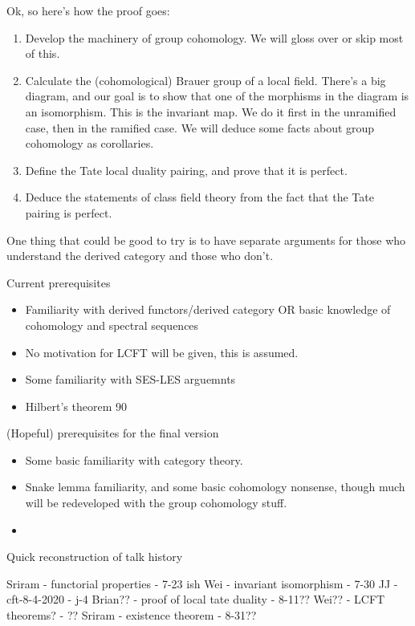 \documentclass[a4paper]{article}
\title{}
\author{Jack J Garzella}
\begin{document}
\maketitle


Ok, so here's how the proof goes:

\begin{enumerate}[(1)]
	\item Develop the machinery of group cohomology.
		We will gloss over or skip most of this.
	\item Calculate the (cohomological) Brauer group of 
		a local field. 
		There's a big diagram, and our goal is to show that
		one of the morphisms in the diagram is an isomorphism.
		This is the invariant map. 
		We do it first in the unramified case, then
		in the ramified case.
		We will deduce some facts about group cohomology as
		corollaries.
	\item Define the Tate local duality pairing, and prove that it
		is perfect.
	\item Deduce the statements of class field theory from the
		fact that the Tate pairing is perfect.
\end{enumerate}

One thing that could be good to try is to have separate 
arguments for those who understand the derived category and those
who don't.

Current prerequisites
\begin{itemize}
	\item Familiarity with derived functors/derived category
		OR basic knowledge of cohomology and spectral sequences
	\item No motivation for LCFT will be given, this is assumed.
	\item Some familiarity with SES-LES arguemnts
	\item Hilbert's theorem 90
\end{itemize}

(Hopeful) prerequisites for the final version
\begin{itemize}
	\item Some basic familiarity with category theory.
	\item Snake lemma familiarity, and some basic
		cohomology nonsense, though much will be redeveloped
		with the group cohomology stuff.
	\item 
\end{itemize}

Quick reconstruction of talk history

Sriram - functorial properties - 7-23 ish
Wei - invariant isomorphism - 7-30
JJ - cft-8-4-2020 - j-4
Brian?? - proof of local tate duality - 8-11??
Wei?? - LCFT theorems? - ??
Sriram - existence theorem - 8-31??
\end{document}
